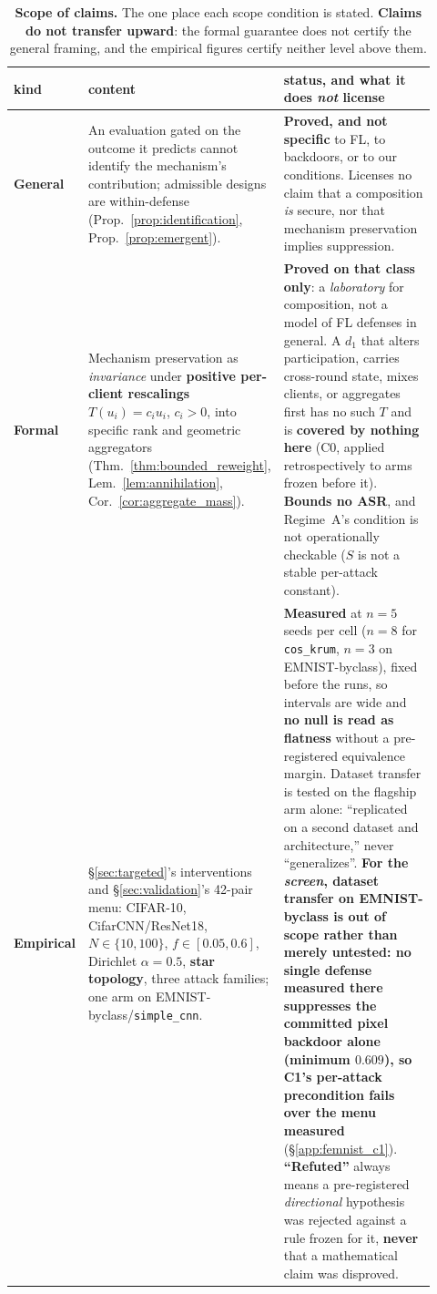 \documentclass{article}
\begin{document}
\begin{table}[h]
\centering\scriptsize\setlength{\tabcolsep}{4pt}
\caption{\textbf{Scope of claims.} The one place each scope condition is stated. \textbf{Claims do not transfer upward}: the formal guarantee does not certify the general framing, and the empirical figures certify neither level above them.}
\label{tab:scope_levels}
\begin{tabular}{@{}p{0.095\linewidth}p{0.285\linewidth}p{0.545\linewidth}@{}}
\toprule
\textbf{kind} & \textbf{content} & \textbf{status, and what it does \emph{not} license} \\
\midrule
\textbf{General} & An evaluation gated on the outcome it predicts cannot identify the mechanism's contribution; admissible designs are within-defense (Prop.~\ref{prop:identification}, Prop.~\ref{prop:emergent}). & \textbf{Proved, and not specific} to FL, to backdoors, or to our conditions. Licenses no claim that a composition \emph{is} secure, nor that mechanism preservation implies suppression. \\
\addlinespace
\textbf{Formal} & Mechanism preservation as \emph{invariance} under \textbf{positive per-client rescalings} $T(u_i)=c_iu_i$, $c_i>0$, into specific rank and geometric aggregators (Thm.~\ref{thm:bounded_reweight}, Lem.~\ref{lem:annihilation}, Cor.~\ref{cor:aggregate_mass}). & \textbf{Proved on that class only}: a \emph{laboratory} for composition, not a model of FL defenses in general. A $d_1$ that alters participation, carries cross-round state, mixes clients, or aggregates first has no such $T$ and is \textbf{covered by nothing here} (C0, applied retrospectively to arms frozen before it). \textbf{Bounds no ASR}, and Regime~A's condition is not operationally checkable ($S$ is not a stable per-attack constant). \\
\addlinespace
\textbf{Empirical} & \S\ref{sec:targeted}'s interventions and \S\ref{sec:validation}'s 42-pair menu: CIFAR-10, CifarCNN/ResNet18, $N\in\{10,100\}$, $f\in[0.05,0.6]$, Dirichlet $\alpha{=}0.5$, \textbf{star topology}, three attack families; one arm on EMNIST-byclass/\texttt{simple\_cnn}. & \textbf{Measured} at $n{=}5$ seeds per cell ($n{=}8$ for \texttt{cos\_krum}, $n{=}3$ on EMNIST-byclass), fixed before the runs, so intervals are wide and \textbf{no null is read as flatness} without a pre-registered equivalence margin. Dataset transfer is tested on the flagship arm alone: ``replicated on a second dataset and architecture,'' never ``generalizes''. \textbf{For the \emph{screen}, dataset transfer on EMNIST-byclass is out of scope rather than merely untested: no single defense measured there suppresses the committed pixel backdoor alone (minimum $0.609$), so C1's per-attack precondition fails over the menu measured} (\S\ref{app:femnist_c1}). \textbf{``Refuted''} always means a pre-registered \emph{directional} hypothesis was rejected against a rule frozen for it, \textbf{never} that a mathematical claim was disproved. \\

\end{tabular}
\end{table}
\end{document}
